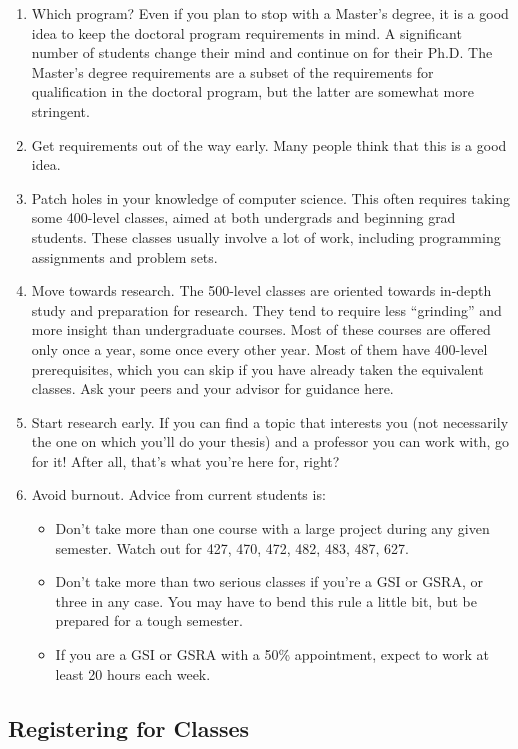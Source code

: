 \documentclass[11pt]{article}
\begin{document}
\begin{enumerate}
\item Which program?  Even if you plan to stop with a Master’s degree, it
   is a good idea to keep the doctoral program requirements in mind.
   A significant number of students change their mind and continue on
   for their Ph.D.  The Master’s degree requirements are a subset of
   the requirements for qualification in the doctoral program, but the
   latter are somewhat more stringent.
\item Get requirements out of the way early.  Many people think that this
   is a good idea.
\item Patch holes in your knowledge of computer science.  This often
   requires taking some 400-level classes, aimed at both undergrads
   and beginning grad students.  These classes usually involve a lot
   of work, including programming assignments and problem sets.
\item Move towards research.  The 500-level classes are oriented towards
   in-depth study and preparation for research.  They tend to require
   less “grinding” and more insight than undergraduate courses.  Most
   of these courses are offered only once a year, some once every
   other year.  Most of them have 400-level prerequisites, which you
   can skip if you have already taken the equivalent classes.  Ask
   your peers and your advisor for guidance here.
\item Start research early.  If you can find a topic that interests you
   (not necessarily the one on which you'll do your thesis) and a
   professor you can work with, go for it!  After all, that's what
   you're here for, right?
\item Avoid burnout.  Advice from current students is:
\begin{itemize}
\item Don't take more than one course with a large project during any
     given semester.  Watch out for 427, 470, 472, 482, 483, 487, 627.
\item Don't take more than two serious classes if you're a GSI or GSRA,
     or three in any case.  You may have to bend this rule a little
     bit, but be prepared for a tough semester.
\item If you are a GSI or GSRA with a 50\% appointment, expect to work
     at least 20 hours each week.
\end{itemize}
\end{enumerate}
\subsection{Registering for Classes}
\label{sec-5_5}
\end{document}
